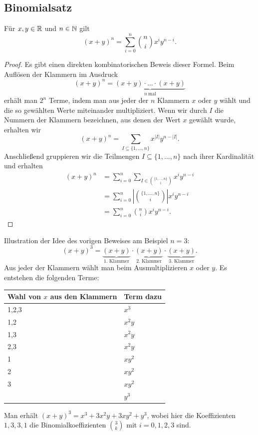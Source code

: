 \subsection{Binomialsatz}

\begin{thm}[Binomialsatz] 
	Für $x, y \in \mathbb{R}$ und $n \in \mathbb{N}$ gilt 
	\[
			(x+y)^n = \sum_{i=0}^n \binom{n}{i} x^i y^{n-i}. 
	\]
\end{thm} 
\begin{proof}
	Es gibt einen direkten kombinatorischen Beweis dieser Formel. Beim Auflösen der Klammern im Ausdruck 
	\[
			(x+y)^n = \underbrace{(x+y) \cdot \ldots \cdot (x+y)}_{n \ \text{mal}}
	\]
	erhält man $2^n$ Terme, indem man aus jeder der $n$ Klammern $x$ oder $y$ wählt und die so gewählten Werte miteinander multipliziert. Wenn wir durch $I$ die Nummern der Klammern bezeichnen, aus denen der Wert $x$ gewählt wurde, erhalten wir 
	\[
			(x+y)^n = \sum_{I \subseteq \{1,\ldots,n\}} x^{|I|} y^{n - |I|}. 
	\]
	Anschließend gruppieren wir die Teilmengen $I \subseteq \{1,\ldots,n\}$ nach ihrer Kardinalität und erhalten
	\begin{align*}
			(x+y)^n & =\sum_{i=0}^n \sum_{I \in \binom{\{1,\ldots,n\}}{i}} x^i y^{n-i} 
			\\ & = \sum_{i=0}^n \left| \binom{\{1,\ldots,n\}}{i} \right| x^i y^{n-i} 
			\\ & = \sum_{i=0}^n \binom{n}{i}  x^i y^{n-i}.
	\end{align*} 
\end{proof} 

\begin{bsp}
	Illustration der Idee des vorigen Beweises am Beispiel $n=3$: 
	\[
	(x+y)^3 = \underbrace{ (x+y) }_{\text{1. Klammer}} \cdot \underbrace{ (x+y) }_{\text{2. Klammer}} \cdot \underbrace{ (x+y) }_{\text{3. Klammer}}.
	\]
	Aus jeder der Klammern wählt man beim Ausmultiplizieren $x$ oder $y$. Es entstehen die folgenden Terme: 
	\begin{center} 
		\begin{tabular}{ll}
			Wahl von $x$ aus den Klammern & Term dazu 
			\\ \hline \hline 
			1,2,3 & $x^3$
			\\ \hline 1,2 &  $x^2 y$
			\\ 1,3 &  $x^2 y$
			\\ 2,3 &  $x^2 y$
			\\ \hline 1 & $x y^2$
			\\ 2 &  $x y^2$
			\\ 3 & $ x y^2$
			\\ \hline & $y^3$
		\end{tabular} 
	\end{center} 
	Man erhält $(x+y)^3 = x^3+ 3 x^2 y + 3 x y^2 + y^3$, wobei hier die Koeffizienten $1,3,3,1$ die Binomialkoeffizienten $\binom{3}{k}$ mit $i=0,1,2,3$ sind. 
\end{bsp} 

